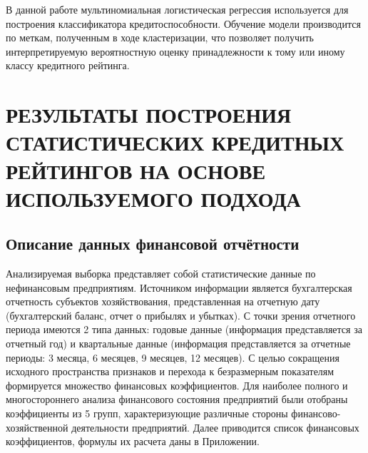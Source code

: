 \documentclass[14pt,a4paper]{extarticle}
\begin{document}
В данной работе мультиномиальная логистическая регрессия используется для построения классификатора 
кредитоспособности. Обучение модели производится по меткам, полученным в ходе кластеризации, 
что позволяет получить интерпретируемую вероятностную оценку принадлежности к тому или иному классу кредитного 
рейтинга.

\clearpage

\section{РЕЗУЛЬТАТЫ ПОСТРОЕНИЯ СТАТИСТИЧЕСКИХ КРЕДИТНЫХ РЕЙТИНГОВ НА ОСНОВЕ ИСПОЛЬЗУЕМОГО ПОДХОДА}

\subsection{Описание данных финансовой отчётности}

Анализируемая выборка представляет собой статистические данные по нефинансовым предприятиям. 
Источником информации является бухгалтерская отчетность субъектов хозяйствования, представленная 
на отчетную дату (бухгалтерский баланс, отчет о прибылях и убытках). С точки зрения отчетного 
периода имеются 2 типа данных: годовые данные (информация представляется за отчетный год) и 
квартальные данные (информация представляется за отчетные периоды: 3 месяца, 6 месяцев, 9 месяцев, 
12 месяцев). С целью сокращения исходного пространства признаков и перехода к безразмерным показателям 
формируется множество финансовых коэффициентов. Для наиболее полного и многостороннего анализа финансового 
состояния предприятий были отобраны коэффициенты из 5 групп, характеризующие различные стороны 
финансово-хозяйственной деятельности предприятий. Далее приводится список финансовых коэффициентов, 
формулы их расчета даны в Приложении.
\end{document}
